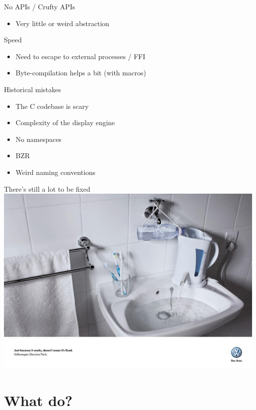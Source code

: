 \documentclass[presentation]{beamer}
\begin{document}
\begin{frame}[label=sec-6-1]{No APIs / Crufty APIs}
\begin{itemize}
\item Very little or weird abstraction
\end{itemize}
\end{frame}

\begin{frame}[label=sec-6-2]{Speed}
\begin{itemize}
\item Need to escape to external processes / FFI
\item Byte-compilation helps a bit (with macros)
\end{itemize}
\end{frame}

\begin{frame}[label=sec-6-3]{Historical mistakes}
\begin{itemize}
\item The C codebase is scary
\item Complexity of the display engine
\item No namespaces
\item BZR
\item Weird naming conventions
\end{itemize}
\end{frame}

\begin{frame}[label=sec-6-4]{There's still a lot to be fixed}
\includegraphics[width=.9\linewidth]{./images/fixed.jpg}
\end{frame}

\section{What do?}
\label{sec-7}
\end{document}
